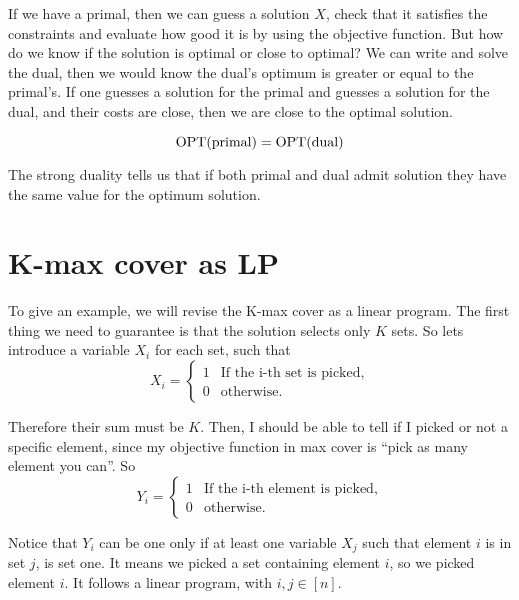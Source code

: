 If we have a primal, then we can guess a solution $X$, check that it satisfies the constraints and evaluate how good it is by using the objective function. But how do we know if the solution is optimal or close to optimal? We can write and solve the dual, then we would know the dual's optimum is greater or equal to the primal's. If one guesses a solution for the primal and guesses a  solution for the dual, and their costs are close, then we are close to the optimal solution.

\begin{thm}
\begin{equation}
    \text{OPT}(\text{primal}) = \text{OPT}(\text{dual})
\end{equation}
\end{thm}

The strong duality tells us that if both primal and dual admit solution they have the same value for the optimum solution.

\section{K-max cover as LP}
To give an example, we will revise the K-max cover as a linear program. The first thing we need to guarantee is that the solution selects only $K$ sets. So lets introduce a variable $X_i$ for each set, such that
\begin{equation}
X_i = \begin{cases}
1 & \text{If the i-th set is picked},\\
0 & \text{otherwise.}
\end{cases} 
\end{equation}

Therefore their sum must be $K$. Then, I should be able to tell if I picked or not a specific element, since my objective function in max cover is ``pick as many element you can''. So
\begin{equation}
Y_i = \begin{cases}
1 & \text{If the i-th element is picked},\\
0 & \text{otherwise.}
\end{cases} 
\end{equation}

Notice that $Y_i$ can be one only if at least one variable $X_j$ such that element $i$ is in set $j$, is set one. It means we picked a set containing element $i$, so we picked element $i$. It follows a linear program, with $i, j \in [n]$.

